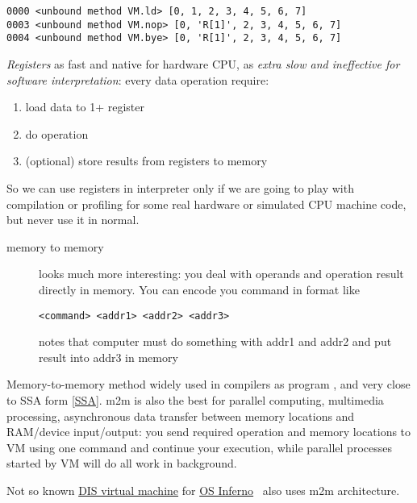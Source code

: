 
\begin{lstlisting}
0000 <unbound method VM.ld> [0, 1, 2, 3, 4, 5, 6, 7]
0003 <unbound method VM.nop> [0, 'R[1]', 2, 3, 4, 5, 6, 7]
0004 <unbound method VM.bye> [0, 'R[1]', 2, 3, 4, 5, 6, 7]
\end{lstlisting}

\bigskip
\emph{Registers} as fast and native for hardware CPU, as \emph{extra slow and
ineffective for software interpretation}: every data operation require:
\begin{enumerate}[nosep]
\item load data to 1+ register
\item do operation
\item (optional) store results from registers to memory 
\end{enumerate}

\bigskip
So we can use registers in interpreter only if we are going to play with
compilation or profiling for some real hardware or simulated CPU machine code,
but never use it in normal.

\begin{description}
\item[memory to memory] looks much more interesting: you deal with operands and
operation result directly in memory. You can encode you command in format like
\begin{lstlisting}
<command> <addr1> <addr2> <addr3> 
\end{lstlisting}
notes that computer must do something with addr1 and addr2 and put result into
addr3 in memory
\end{description}

Memory-to-memory method widely used in compilers as program  \cite{dragon}, and very close to SSA form \ref{SSA}. m2m is also
the best for parallel computing, multimedia processing, asynchronous data transfer between memory locations and
RAM/device input/output: you send required operation and memory locations to VM using one
command and continue your execution, while parallel processes started by VM will
do all work in background.

Not so known \href{http://www.vitanuova.com/inferno/papers/dis.html}{DIS virtual
machine} for \href{http://www.vitanuova.com/inferno/}{OS Inferno}\  also uses m2m architecture. 

